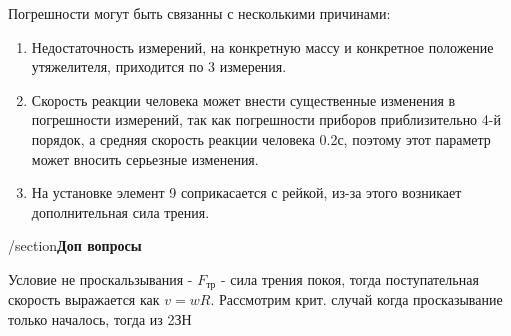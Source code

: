 \documentclass[a4paper]{article}
\begin{document}
Погрешности могут быть связанны с несколькими причинами:

\begin{enumerate}
    \item Недостаточность измерений, на конкретную массу и конкретное положение утяжелителя, приходится по 3 измерения.
    \item Скорость реакции человека может внести существенные изменения в погрешности измерений, так как погрешности приборов приблизительно 4-й порядок, а средняя скорость реакции человека 0.2с, поэтому этот параметр может вносить серьезные изменения.
    \item На установке элемент 9 соприкасается с рейкой, из-за этого возникает дополнительная сила трения.
\end{enumerate}

/section{\textbf{Доп вопросы}}
\begin{enumerate}
Условие не проскальзывания - $F_{\text{тр}}$ - сила трения покоя, тогда поступательная скорость выражается как $v=wR$. Рассмотрим крит. случай когда просказывание только началось, тогда из 2ЗН 
\end{enumerate}
\end{document}
